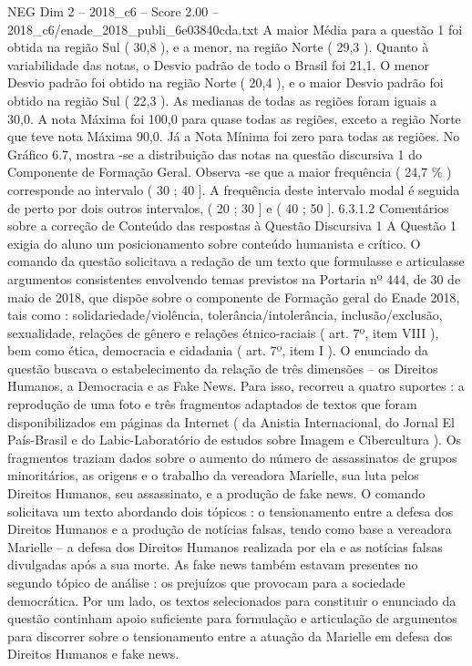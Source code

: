 \begin{textsample}{NEG Dim 2 – 2018\_c6 – Score 2.00 – 2018\_c6/enade\_2018\_publi\_6e03840cda.txt}
A maior Média para a questão 1 foi obtida na região Sul ( 30,8 ), e a menor, na região Norte ( 29,3 ).
Quanto à variabilidade das notas, o Desvio padrão de todo o Brasil foi 21,1.
O menor Desvio padrão foi obtido na região Norte ( 20,4 ), e o maior Desvio padrão foi obtido na região Sul ( 22,3 ).
As medianas de todas as regiões foram iguais a 30,0.
A nota Máxima foi 100,0 para quase todas as regiões, exceto a região Norte que teve nota Máxima 90,0.
Já a Nota Mínima foi zero para todas as regiões.
No Gráfico 6.7, mostra -se a distribuição das notas na questão discursiva 1 do Componente de Formação Geral.
Observa -se que a maior frequência ( 24,7 \% ) corresponde ao intervalo ( 30 ; 40 ].
A frequência deste intervalo modal é seguida de perto por dois outros intervalos, ( 20 ; 30 ] e ( 40 ; 50 ]. 6.3.1.2 Comentários sobre a correção de Conteúdo das respostas à Questão Discursiva 1 A Questão 1 exigia do aluno um posicionamento sobre conteúdo humanista e crítico.
O comando da questão solicitava a redação de um texto que formulasse e articulasse argumentos consistentes envolvendo temas previstos na Portaria nº 444, de 30 de maio de 2018, que dispõe sobre o componente de Formação geral do Enade 2018, tais como : solidariedade/violência, tolerância/intolerância, inclusão/exclusão, sexualidade, relações de gênero e relações étnico-raciais ( art. 7º, item VIII ), bem como ética, democracia e cidadania ( art. 7º, item I ).
O enunciado da questão buscava o estabelecimento da relação de três dimensões – os Direitos Humanos, a Democracia e as Fake News.
Para isso, recorreu a quatro suportes : a reprodução de uma foto e três fragmentos adaptados de textos que foram disponibilizados em páginas da Internet ( da Anistia Internacional, do Jornal El País-Brasil e do Labic-Laboratório de estudos sobre Imagem e Cibercultura ).
Os fragmentos traziam dados sobre o aumento do número de assassinatos de grupos minoritários, as origens e o trabalho da vereadora Marielle, sua luta pelos Direitos Humanos, seu assassinato, e a produção de fake news.
O comando solicitava um texto abordando dois tópicos : o tensionamento entre a defesa dos Direitos Humanos e a produção de notícias falsas, tendo como base a vereadora Marielle – a defesa dos Direitos Humanos realizada por ela e as notícias falsas divulgadas após a sua morte.
As fake news também estavam presentes no segundo tópico de análise : os prejuízos que provocam para a sociedade democrática.
Por um lado, os textos selecionados para constituir o enunciado da questão continham apoio suficiente para formulação e articulação de argumentos para discorrer sobre o tensionamento entre a atuação da Marielle em defesa dos Direitos Humanos e fake news.

\end{textsample}

